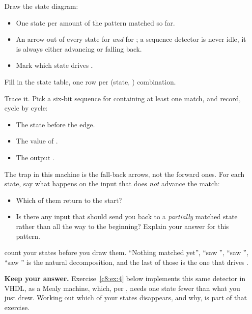 \begin{parts}
  \item Draw the state diagram:
    \begin{itemize}
      \item One state per amount of the pattern matched so far.
      \item An arrow out of every state for  \emph{and} for ; a sequence
        detector is never idle, it is always either advancing or falling back.
      \item Mark which state drives .
    \end{itemize}
  \item Fill in the state table, one row per (state, ) combination.
  \item Trace it. Pick a six-bit sequence for  containing at least one match, and record,
    cycle by cycle:
    \begin{itemize}
      \item The state before the edge.
      \item The value of .
      \item The output .
    \end{itemize}
  \item The trap in this machine is the fall-back arrows, not the forward ones. For each state, say
    what happens on the input that does \emph{not} advance the match:
    \begin{itemize}
      \item Which of them return to the start?
      \item Is there any input that should send you back to a \emph{partially} matched state rather
        than all the way to the beginning? Explain your answer for this pattern.
    \end{itemize}
\end{parts}
\note[Tip] count your states before you draw them. ``Nothing matched yet'', ``saw '',
``saw '', ``saw '' is the natural decomposition, and the last of those is the
one that drives .

\textbf{Keep your answer.} Exercise~\ref{c8:ex:4} below implements this same detector in VHDL, as a
Mealy machine, which, per , needs one state fewer than what you just drew. Working out
which of your states disappears, and why, is part of that exercise.

\label{c8:set:3}


